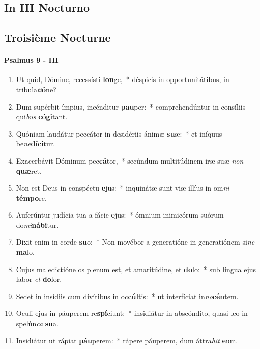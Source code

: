 \documentclass[twoside]{article}
\begin{document}
\begin{paracol}[1]{2}
\subsection{In III Nocturno}

\switchcolumn

\subsection{Troisième Nocturne}

\switchcolumn*

\paragraph{Psalmus 9 - III}


\begin{enumerate}[wide, itemsep=0mm, labelwidth=!, labelindent=0pt, label=\color{gregoriocolor}\theenumi]
\item Ut quid, Dómine, recessísti \textbf{lon}ge,~* déspicis in opportunitátibus, in tribula\textit{ti}\textbf{ó}ne?
\item Dum supérbit ímpius, incénditur \textbf{pau}per:~* comprehendúntur in consíliis qui\textit{bus} \textbf{có}\textbf{gi}tant.
\item Quóniam laudátur peccátor in desidériis ánimæ \textbf{su}æ:~* et iníquus be\textit{ne}\textbf{dí}\textbf{ci}tur.
\item Exacerbávit Dóminum pec\textbf{cá}tor,~* secúndum multitúdinem iræ suæ \textit{non} \textbf{quæ}ret.
\item Non est Deus in conspéctu \textbf{e}jus:~* inquinátæ sunt viæ illíus in om\textit{ni} \textbf{tém}\textbf{po}re.
\item Auferúntur judícia tua a fácie \textbf{e}jus:~* ómnium inimicórum suórum do\textit{mi}\textbf{ná}\textbf{bi}tur.
\item Dixit enim in corde \textbf{su}o:~* Non movébor a generatióne in generatiónem si\textit{ne} \textbf{ma}lo.
\item Cujus maledictióne os plenum est, et amaritúdine, et \textbf{do}lo:~* sub lingua ejus labor \textit{et} \textbf{do}lor.
\item Sedet in insídiis cum divítibus in oc\textbf{cúl}tis:~* ut interfíciat in\textit{no}\textbf{cén}tem.
\item Oculi ejus in páuperem re\textbf{spí}ciunt:~* insidiátur in abscóndito, quasi leo in spelún\textit{ca} \textbf{su}a.
\item Insidiátur ut rápiat \textbf{páu}perem:~* rápere páuperem, dum áttra\textit{hit} \textbf{e}um.

\end{enumerate}
\end{paracol}
\end{document}
